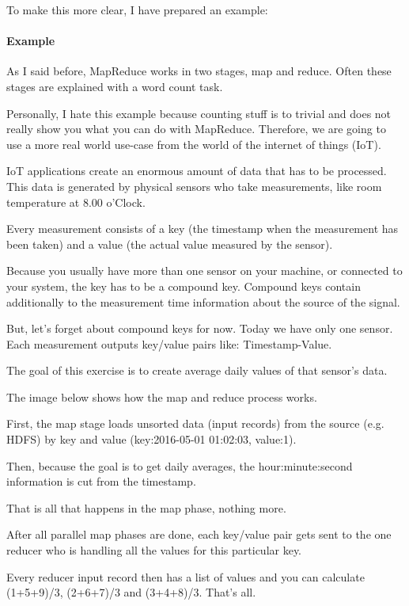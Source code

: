 \documentclass[12pt]{scrartcl} %
\begin{document}
To make this more clear, I have prepared an example:

\paragraph{Example}
As I said before, MapReduce works in two stages, map and reduce. Often these stages are explained with a word count task.

Personally, I hate this example because counting stuff is to trivial and does not really show you what you can do with MapReduce. Therefore, we are going to use a more real world use-case from the world of the internet of things (IoT).

IoT applications create an enormous amount of data that has to be processed. This data is generated by physical sensors who take measurements, like room temperature at 8.00 o’Clock.

Every measurement consists of a key (the timestamp when the measurement has been taken) and a value (the actual value measured by the sensor).

Because you usually have more than one sensor on your machine, or connected to your system, the key has to be a compound key. Compound keys contain additionally to the measurement time information about the source of the signal.

But, let’s forget about compound keys for now. Today we have only one sensor. Each measurement outputs key/value pairs like: Timestamp-Value.

The goal of this exercise is to create average daily values of that sensor’s data.

The image below shows how the map and reduce process works.

First, the map stage loads unsorted data (input records) from the source (e.g. HDFS) by key and value (key:2016-05-01 01:02:03, value:1).

Then, because the goal is to get daily averages, the hour:minute:second information is cut from the timestamp.

That is all that happens in the map phase, nothing more.

After all parallel map phases are done, each key/value pair gets sent to the one reducer who is handling all the values for this particular key.

Every reducer input record then has a list of values and you can calculate (1+5+9)/3, (2+6+7)/3 and (3+4+8)/3. That’s all.
\end{document}

